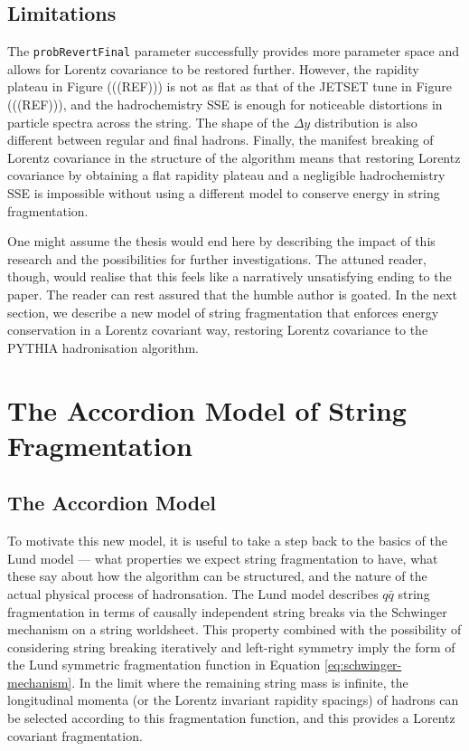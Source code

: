 \documentclass[12pt,a4paper]{report}
\begin{document}
\section{Limitations}
The \texttt{probRevertFinal} parameter successfully provides more parameter space and allows for Lorentz covariance to be restored further. However, the rapidity plateau in Figure (((REF))) is not as flat as that of the JETSET tune in Figure (((REF))), and the hadrochemistry SSE is enough for noticeable distortions in particle spectra across the string. The shape of the $\Delta y$ distribution is also different between regular and final hadrons. Finally, the manifest breaking of Lorentz covariance in the structure of the algorithm means that restoring Lorentz covariance by obtaining a flat rapidity plateau and a negligible hadrochemistry SSE is impossible without using a different model to conserve energy in string fragmentation.

One might assume the thesis would end here by describing the impact of this research and the possibilities for further investigations. The attuned reader, though, would realise that this feels like a narratively unsatisfying ending to the paper. The reader can rest assured that the humble author is goated. In the next section, we describe a new model of string fragmentation that enforces energy conservation in a Lorentz covariant way, restoring Lorentz covariance to the PYTHIA hadronisation algorithm.

\chapter{The Accordion Model of String Fragmentation}
\label{chap:accordion}
\section{The Accordion Model}
To motivate this new model, it is useful to take a step back to the basics of the Lund model --- what properties we expect string fragmentation to have, what these say about how the algorithm can be structured, and the nature of the actual physical process of hadronsation. The Lund model describes $q\bar{q}$ string fragmentation in terms of causally independent string breaks via the Schwinger mechanism on a string worldsheet. This property combined with the possibility of considering string breaking iteratively and left-right symmetry imply the form of the Lund symmetric fragmentation function in Equation \eqref{eq:schwinger-mechanism}. In the limit where the remaining string mass is infinite, the longitudinal momenta (or the Lorentz invariant rapidity spacings) of hadrons can be selected according to this fragmentation function, and this provides a Lorentz covariant fragmentation.
\end{document}

